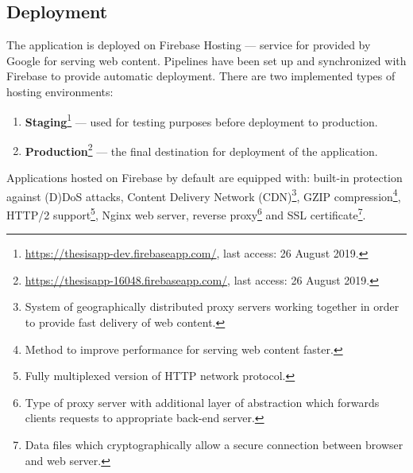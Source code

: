 \documentclass{article} %
\begin{document}
\subsection{Deployment}
The application is deployed on Firebase Hosting --- service for provided by Google for serving web content. Pipelines have been set up and synchronized with Firebase to provide automatic deployment. There are two implemented types of hosting environments:
\begin{enumerate}
    \item \textbf{Staging}\footnote{\url{https://thesisapp-dev.firebaseapp.com/}, last access: 26 August 2019.} --- used for testing purposes before deployment to production.
    \item \textbf{Production}\footnote{\url{https://thesisapp-16048.firebaseapp.com/}, last access: 26 August 2019.} --- the final destination for deployment of the application.
\end{enumerate}
Applications hosted on Firebase by default are equipped with: built-in protection against (D)DoS attacks, Content Delivery Network (CDN)\footnote{System of geographically distributed proxy servers working together in order to provide fast delivery of web content.}, GZIP compression\footnote{Method to improve performance for serving web content faster.}, HTTP/2 support\footnote{Fully multiplexed version of HTTP network protocol.}, Nginx web server, reverse proxy\footnote{Type of proxy server with additional layer of abstraction which forwards clients requests to appropriate back-end server.} and SSL certificate\footnote{Data files which cryptographically allow a secure connection between browser and web server.}.\\
\newline
\end{document}
